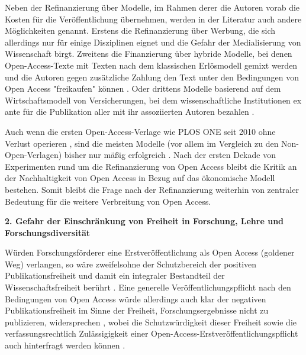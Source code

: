Neben der Refinanzierung über Modelle, im Rahmen derer die Autoren vorab die Kosten für die Veröffentlichung übernehmen, werden in der Literatur auch andere Möglichkeiten genannt. Erstens die Refinanzierung über Werbung, die sich allerdings nur für einige Disziplinen \cite{bjork_2004_open} eignet und die Gefahr der Medialisierung von Wissenschaft birgt. Zweitens die Finanzierung über hybride Modelle, bei denen Open-Access-Texte mit Texten nach dem klassischen Erlösmodell gemixt werden und die Autoren gegen zusätzliche Zahlung den Text unter den Bedingungen von Open Access "freikaufen" können \cite{bjork_2012_hybrid}. Oder drittens Modelle basierend auf dem Wirtschaftsmodell von Versicherungen, bei dem wissenschaftliche Institutionen ex ante für die Publikation aller mit ihr assoziierten Autoren bezahlen \cite[:63]{mueller-langer_2010}.

Auch wenn die ersten Open-Access-Verlage wie PLOS ONE seit 2010 ohne Verlust operieren \cite{Jerram_2010}, sind die meisten Modelle (vor allem im Vergleich zu den Non-Open-Verlagen) bisher nur mäßig erfolgreich \cite{bjork_2012_hybrid}. Nach der ersten Dekade von Experimenten rund um die Refinanzierung von Open Access bleibt die Kritik an der Nachhaltigkeit von Open Access in Bezug auf das ökonomische Modell bestehen. Somit bleibt die Frage nach der Refinanzierung weiterhin von zentraler Bedeutung für die weitere Verbreitung von Open Access.

\textbf{2. Gefahr der Einschränkung von Freiheit in Forschung, Lehre und Forschungsdiversität}

Würden Forschungsförderer eine Erstveröffentlichung als Open Access (goldener Weg) verlangen, so wäre zweifelsohne der Schutzbereich der positiven Publikationsfreiheit und damit ein integraler Bestandteil der Wissenschaftsfreiheit berührt \cite[:191]{Fehling_2014} \cite{peukert2013wissenschaftliches}. Eine generelle Veröffentlichungspflicht nach den Bedingungen von Open Access würde allerdings auch klar der negativen Publikationsfreiheit im Sinne der Freiheit, Forschungsergebnisse nicht zu publizieren, widersprechen \cite[:192]{Fehling_2014}, wobei die Schutzwürdigkeit dieser Freiheit sowie die verfassungsrechtlich Zulässigigkeit einer Open-Access-Erstveröffentlichungspflicht auch hinterfragt werden können \cite[:192]{Fehling_2014} \cite{peukert2013wissenschaftliches}.

